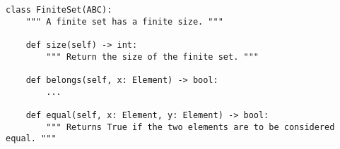 \begin{verbatim}
class FiniteSet(ABC):
    """ A finite set has a finite size. """

    def size(self) -> int:
        """ Return the size of the finite set. """

    def belongs(self, x: Element) -> bool:
        ...

    def equal(self, x: Element, y: Element) -> bool:
        """ Returns True if the two elements are to be considered equal. """
\end{verbatim}